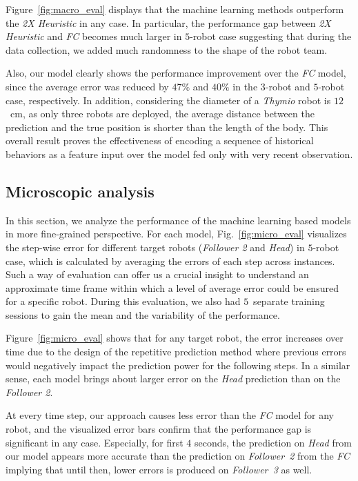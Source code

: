 \documentclass[letterpaper, 10 pt, conference]{ieeeconf}  %
\begin{document}
	Figure~\ref{fig:macro_eval} displays that the machine learning methods outperform
	the \emph{2X Heuristic} in any case. In particular, the performance gap between
	\emph{2X Heuristic} and \emph{FC} becomes much larger in $5$-robot case suggesting that
	during the data collection, we added much randomness to the shape of the robot team.

	Also, our model clearly shows the performance improvement over the \emph{FC} model, since
	the average error was reduced by $47\%$ and $40\%$ in the $3$-robot and $5$-robot case,
	respectively. In addition, considering the diameter of a \emph{Thymio} robot is
	$12$~cm, as only three robots are deployed, the average distance between the prediction
	and the true position is shorter than the length of the body. This overall result proves
	the effectiveness of encoding a sequence of historical behaviors as a feature input
	over the model fed only with very recent observation.


	\subsection{Microscopic analysis}
	\label{sec:microscopic_analysis}

	In this section, we analyze the performance of the machine learning based models
	in more fine-grained perspective. For each model, Fig.~\ref{fig:micro_eval} visualizes the
	step-wise error for different target robots (\emph{Follower 2} and \emph{Head})
	in $5$-robot case, which is calculated by averaging the errors of each step across instances.
	Such a way of evaluation can offer us a crucial insight to understand an approximate time frame
	within which a level of average error could be ensured for a specific robot. During this
	evaluation, we also had $5$~separate training sessions to gain the mean and the variability
	of the performance.

	Figure~\ref{fig:micro_eval} shows that for any target robot, the error increases over time due to the
	design of the repetitive prediction method where previous errors would negatively
	impact the prediction power for the following steps. In a similar sense, each model
	brings about larger error on the \emph{Head} prediction than on the \emph{Follower 2}.

	At every time step, our approach causes less error than the \emph{FC} model for any robot, and
    the visualized error bars confirm that the performance gap is significant in any case.
    Especially, for first $4$ seconds, the prediction on \emph{Head} from our model appears
    more accurate than the prediction on \emph{Follower~2} from the \emph{FC} implying that
    until then, lower errors is produced on \emph{Follower~3} as well.
\end{document}
